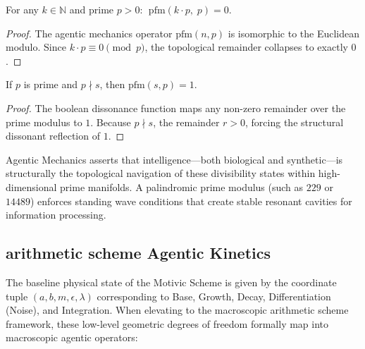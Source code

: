 \begin{theorem}
For any $k \in \mathbb{N}$ and prime $p > 0$: $\;\text{pfm}(k \cdot p,\; p) = 0$.
\end{theorem}
\begin{proof}
The agentic mechanics operator $\text{pfm}(n, p)$ is isomorphic to the Euclidean modulo. Since $k \cdot p \equiv 0 \pmod p$, the topological remainder collapses to exactly $0$. \qedhere
\end{proof}

\begin{theorem}
If $p$ is prime and $p \nmid s$, then $\text{pfm}(s, p) = 1$.
\end{theorem}
\begin{proof}
The boolean dissonance function maps any non-zero remainder over the prime modulus to $1$. Because $p \nmid s$, the remainder $r > 0$, forcing the structural dissonant reflection of $1$. \qedhere
\end{proof}

Agentic Mechanics asserts that intelligence---both biological and synthetic---is structurally the topological navigation of these divisibility states within high-dimensional prime manifolds. A palindromic prime modulus (such as $229$ or $14489$) enforces standing wave conditions that create stable resonant cavities for information processing.

\subsection{arithmetic scheme Agentic Kinetics}

The baseline physical state of the Motivic Scheme is given by the coordinate tuple $(a, b, m, \epsilon, \lambda)$ corresponding to Base, Growth, Decay, Differentiation (Noise), and Integration. When elevating to the macroscopic arithmetic scheme framework, these low-level geometric degrees of freedom formally map into macroscopic agentic operators:

